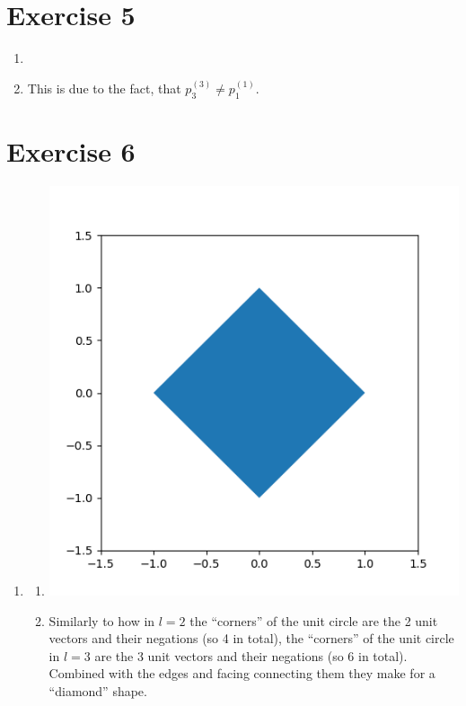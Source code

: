 \documentclass[12pt]{article}
\begin{document}
\section*{Exercise 5}
\begin{enumerate}[label=(\alph*)]
	\item	
	\item	This is due to the fact, that $p_3^{(3)} \neq p_1^{(1)}$.
\end{enumerate}

\section*{Exercise 6}
\begin{enumerate}[label=(\alph*)]
	\item	\begin{enumerate}[label=(\roman*)]
				\item	\includegraphics{code/exercise_06_a.png}
				\item	Similarly to how in $l=2$ the ``corners'' of the unit circle are the 2 unit vectors and their negations (so 4 in total), the ``corners'' of the unit circle in $l=3$ are the 3 unit vectors and their negations (so 6 in total). Combined with the edges and facing connecting them they make for a ``diamond'' shape.
			\end{enumerate}

\end{enumerate}
\end{document}
